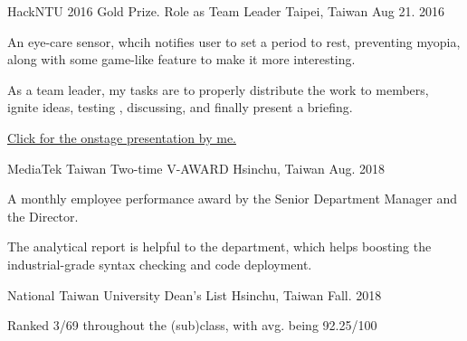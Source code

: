 

\begin{cventries}
\cventry
    {HackNTU 2016} %
    {Gold Prize. Role as Team Leader} %
    {Taipei, Taiwan} %
    {Aug 21. 2016} %
    {
      \begin{cvitems} %
        \item {An eye-care sensor, whcih notifies user to set a period to rest, preventing myopia, along with some game-like feature to make it more interesting.}
        \item {As a team leader, my tasks are to properly distribute the work to members, ignite ideas, testing , discussing, and finally present a briefing.}
        \item {\href{https://www.youtube.com/watch?v=LerD1-Vispg}{Click for the onstage presentation by me.}}
      \end{cvitems}
    } 

\cventry
    {MediaTek Taiwan} %
    {Two-time V-AWARD} %
    {Hsinchu, Taiwan} %
    {Aug. 2018} %
    {
      \begin{cvitems} %
        \item {A monthly employee performance award by the Senior Department Manager and the Director.}
        \item {The analytical report is helpful to the department, which helps boosting the industrial-grade syntax checking and code deployment.}
      \end{cvitems}
    }

\cventry
    {National Taiwan University} %
    {Dean's List} %
    {Hsinchu, Taiwan} %
    {Fall. 2018} %
    {
      \begin{cvitems} %
        \item {Ranked 3/69 throughout the (sub)class, with avg. being 92.25/100}
      \end{cvitems}
    }


\end{cventries}
